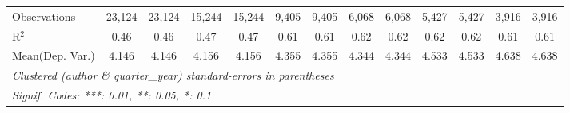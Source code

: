 \begin{tabular}{lcccccccccccc}
   Observations                             & 23,124  & 23,124       & 15,244  & 15,244        & 9,405   & 9,405         & 6,068       & 6,068         & 5,427       & 5,427          & 3,916        & 3,916\\  
   R$^2$                                    & 0.46    & 0.46         & 0.47    & 0.47          & 0.61    & 0.61          & 0.62        & 0.62          & 0.62        & 0.62           & 0.61         & 0.61\\  
Mean(Dep. Var.) & 4.146 & 4.146 & 4.156 & 4.156 & 4.355 & 4.355 & 4.344 & 4.344 & 4.533 & 4.533 & 4.638 & 4.638 \\
   \midrule \midrule
   \multicolumn{13}{l}{\emph{Clustered (author \& quarter\_year) standard-errors in parentheses}}\\
   \multicolumn{13}{l}{\emph{Signif. Codes: ***: 0.01, **: 0.05, *: 0.1}}\\
\end{tabular}
\par\endgroup
